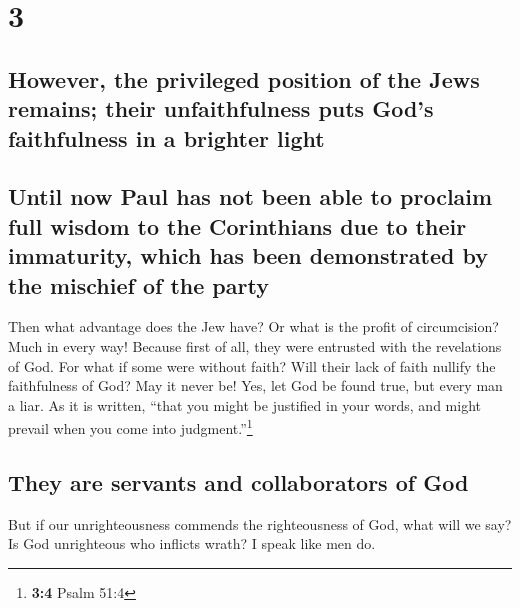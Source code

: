 \hypertarget{section-2}{%
\section{3}\label{section-2}}

\hypertarget{however-the-privileged-position-of-the-jews-remains-their-unfaithfulness-puts-gods-faithfulness-in-a-brighter-light}{%
\subsection{However, the privileged position of the Jews remains; their
unfaithfulness puts God's faithfulness in a brighter
light}\label{however-the-privileged-position-of-the-jews-remains-their-unfaithfulness-puts-gods-faithfulness-in-a-brighter-light}}

\hypertarget{until-now-paul-has-not-been-able-to-proclaim-full-wisdom-to-the-corinthians-due-to-their-immaturity-which-has-been-demonstrated-by-the-mischief-of-the-party}{%
\subsection{Until now Paul has not been able to proclaim full wisdom to
the Corinthians due to their immaturity, which has been demonstrated by
the mischief of the
party}\label{until-now-paul-has-not-been-able-to-proclaim-full-wisdom-to-the-corinthians-due-to-their-immaturity-which-has-been-demonstrated-by-the-mischief-of-the-party}}

 Then what advantage does the Jew have? Or what is the
profit of circumcision?  Much in every way! Because first
of all, they were entrusted with the revelations of God. 
For what if some were without faith? Will their lack of faith nullify
the faithfulness of God?  May it never be! Yes, let God be
found true, but every man a liar. As it is written, ``that you might be
justified in your words, and might prevail when you come into
judgment.''\footnote{\textbf{3:4} Psalm 51:4}

\hypertarget{they-are-servants-and-collaborators-of-god}{%
\subsection{They are servants and collaborators of
God}\label{they-are-servants-and-collaborators-of-god}}

 But if our unrighteousness commends the righteousness of
God, what will we say? Is God unrighteous who inflicts wrath? I speak
like men do.

